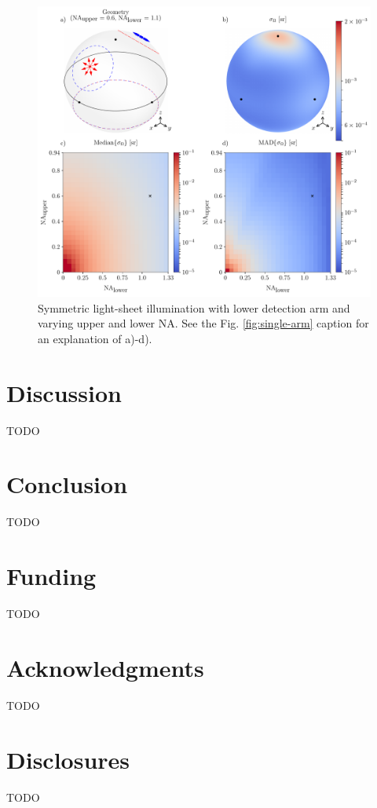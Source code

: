\documentclass[10pt]{article}
\begin{document}
\begin{figure}[htbp]
\centering\includegraphics[width=\textwidth]{triple-arm}
\caption{Symmetric light-sheet illumination with lower detection arm and
    varying upper and lower NA. See the Fig. \ref{fig:single-arm} caption for
    an explanation of a)-d).}
\label{fig:triple-arm}
\end{figure}

\section{Discussion}
TODO



\section{Conclusion}
TODO

\section*{Funding}
TODO

\section*{Acknowledgments}
TODO

\section*{Disclosures}
TODO
\end{document}
